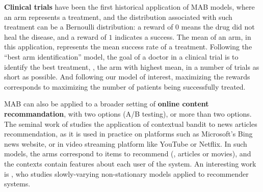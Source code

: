 \textbf{Clinical trials} have been the first historical application of MAB models, where an arm represents a treatment, and the distribution associated with such treatment can be a Bernoulli distribution: a reward of $0$ means the drug did not heal the disease, and a reward of $1$ indicates a success. The mean of an arm, in this application, represents the mean success rate of a treatment.
Following the ``best arm identification'' model, the goal of a doctor in a clinical trial is to identify the best treatment, \ie, the arm with highest mean, in a number of trials as short as possible.
And following our model of interest, maximizing the rewards corresponds to maximizing the number of patients being successfully treated.
%

%

    MAB can also be applied to a broader setting of \textbf{online content recommandation},
    with two options (A/B testing), or more than two options.
    The seminal work of \cite{Li10} studies the application of contextual bandit to news articles recommendation, as it is used in practice on platforms such as Microsoft's Bing news website,
    or in video streaming platform like YouTube or Netflix.
    In such models, the arms correspond to items to recommend (\eg, articles or movies), and the contexts contain features about each user of the system.
    An interesting work is \cite{Louedec16}, who studies slowly-varying non-stationary models applied to recommender systems.

